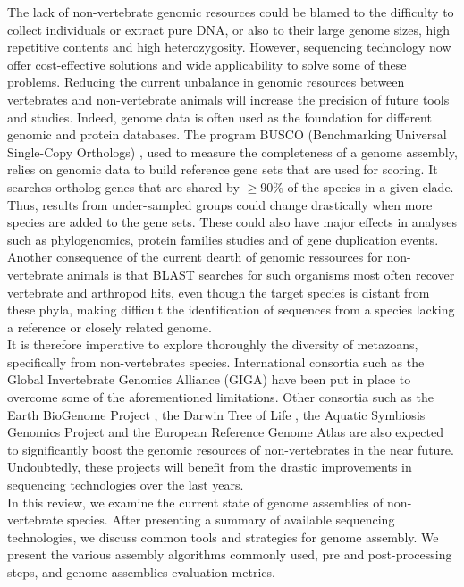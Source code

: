 The lack of non-vertebrate genomic resources could be blamed to the difficulty to collect individuals or extract pure DNA, or also to their large genome sizes, high repetitive contents and high heterozygosity. However, sequencing technology now offer cost-effective solutions and wide applicability to solve some of these problems. Reducing the current unbalance in genomic resources between vertebrates and non-vertebrate animals will increase the precision of future tools and studies. Indeed, genome data is often used as the foundation for different genomic and protein databases. The program BUSCO (Benchmarking Universal Single-Copy Orthologs) \cite{busco_evaluation}, used to measure the completeness of a genome assembly, relies on genomic data to build reference gene sets that are used for scoring. It searches ortholog genes that are shared by $\geq$90\% of the species in a given clade. Thus, results from under-sampled groups could change drastically when more species are added to the gene sets. These could also have major effects in analyses such as phylogenomics, protein families studies and of gene duplication events. Another consequence of the current dearth of genomic ressources for non-vertebrate animals is that BLAST \cite{blast} searches for such organisms most often recover vertebrate and arthropod hits, even though the target species is distant from these phyla, making difficult the identification of sequences from a species lacking a reference or closely related genome. \\

It is therefore imperative to explore thoroughly the diversity of metazoans, specifically from non-vertebrates species. International consortia such as the Global Invertebrate Genomics Alliance (GIGA) \cite{giga2014, giga2017} have been put in place to overcome some of the aforementioned limitations. Other consortia such as  the Earth BioGenome Project \cite{biogenome}, the Darwin Tree of Life \cite{dtol}, the Aquatic Symbiosis Genomics Project \cite{aquatic_symbiosis} and the European Reference Genome Atlas \cite{erga} are also expected to significantly boost the genomic resources of non-vertebrates in the near future. Undoubtedly, these projects will benefit from the drastic improvements in sequencing technologies over the last years.\\

In this review, we examine the current state of genome assemblies of non-vertebrate species. After presenting a summary of available sequencing technologies, we discuss common tools and strategies for genome assembly. We present the various assembly algorithms commonly used, pre and post-processing steps, and genome assemblies evaluation metrics. \\

